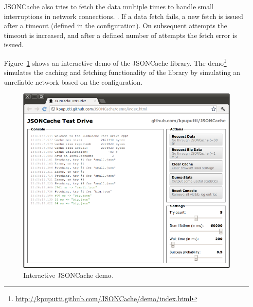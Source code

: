 JSONCache also tries to fetch the data multiple times to handle small
interruptions in network connections. . If a data fetch fails, a new fetch is
issued after a timeout (defined in the configuration). On subsequent
attempts the timeout is increased, and after a defined number of
attempts the fetch error is issued.

Figure~\ref{figure:jsoncache-demo.png} shows an interactive demo of
the JSONCache library. The
demo\footnote{\url{http://kpuputti.github.com/JSONCache/demo/index.html}}
simulates the caching and fetching functionality of the library by
simulating an unreliable network based on the configuration.

\begin{figure}[ht]
  \begin{center}
    \includegraphics[width=\textwidth]{images/jsoncache-demo.png}
    \caption{Interactive JSONCache demo.}
    \label{figure:jsoncache-demo.png}
  \end{center}
\end{figure}
